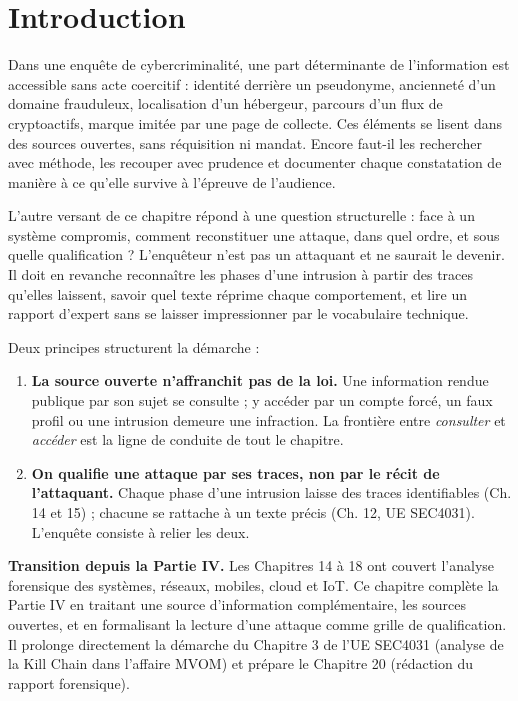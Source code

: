 \section{Introduction}

Dans une enquête de cybercriminalité, une part déterminante de l'information est accessible sans acte coercitif : identité derrière un pseudonyme, ancienneté d'un domaine frauduleux, localisation d'un hébergeur, parcours d'un flux de cryptoactifs, marque imitée par une page de collecte. Ces éléments se lisent dans des sources ouvertes, sans réquisition ni mandat. Encore faut-il les rechercher avec méthode, les recouper avec prudence et documenter chaque constatation de manière à ce qu'elle survive à l'épreuve de l'audience.

L'autre versant de ce chapitre répond à une question structurelle : face à un système compromis, comment reconstituer une attaque, dans quel ordre, et sous quelle qualification ? L'enquêteur n'est pas un attaquant et ne saurait le devenir. Il doit en revanche reconnaître les phases d'une intrusion à partir des traces qu'elles laissent, savoir quel texte réprime chaque comportement, et lire un rapport d'expert sans se laisser impressionner par le vocabulaire technique.

Deux principes structurent la démarche :

\begin{enumerate}
\item \textbf{La source ouverte n'affranchit pas de la loi.} Une information rendue publique par son sujet se consulte ; y accéder par un compte forcé, un faux profil ou une intrusion demeure une infraction. La frontière entre \emph{consulter} et \emph{accéder} est la ligne de conduite de tout le chapitre.
\item \textbf{On qualifie une attaque par ses traces, non par le récit de l'attaquant.} Chaque phase d'une intrusion laisse des traces identifiables (Ch. 14 et 15) ; chacune se rattache à un texte précis (Ch. 12, UE SEC4031). L'enquête consiste à relier les deux.
\end{enumerate}

\begin{boxinfo}
\textbf{Transition depuis la Partie IV.} Les Chapitres 14 à 18 ont couvert l'analyse forensique des systèmes, réseaux, mobiles, cloud et IoT. Ce chapitre complète la Partie IV en traitant une source d'information complémentaire, les sources ouvertes, et en formalisant la lecture d'une attaque comme grille de qualification. Il prolonge directement la démarche du Chapitre 3 de l'UE SEC4031 (analyse de la Kill Chain dans l'affaire MVOM) et prépare le Chapitre 20 (rédaction du rapport forensique).
\end{boxinfo}

